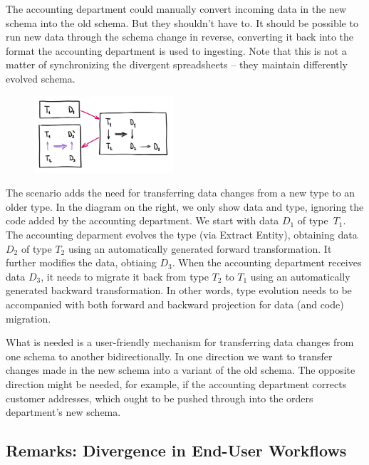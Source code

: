 \documentclass[english,submission]{programming}
\DeclareRobustCommand{\frameworkbox}[1]{\leftbar#1\endleftbar}
\newcommand{\frameworkboxtitle}[1]{\noindent{\firamedium #1.}\quad}
\begin{document}
The accounting department could manually convert incoming data in the new schema into the old schema. But they
shouldn't have to. It should be possible to run new data through the schema change in reverse,
converting it back into the format the accounting department is used to ingesting. Note that
this is not a matter of synchronizing the divergent spreadsheets -- they maintain differently
evolved schema.

\frameworkbox{
\begin{figure}
\vspace{-1.5em}
\includegraphics[width=14em]{figures/arr-backport.png}
\vspace{-2.5em}
\end{figure}
\frameworkboxtitle{Bidirectional Data Migration}
The scenario adds the need for transferring data changes from a new type to an older type.
In the diagram on the right, we only show data and type, ignoring the code added by the
accounting department. We start with data $D_1$ of type~$T_1$. The accounting deparment
evolves the type (via Extract Entity), obtaining data $D_2$ of type $T_2$ using an automatically
generated forward transformation. It further modifies the data, obtiaing $D_3$. When the
accounting department receives data $D_3$, it needs to migrate it back from type $T_2$ to
$T_1$ using an automatically generated backward transformation. In other words,
type evolution needs to be accompanied with both forward and backward projection for data
(and code) migration.}

What is needed is a user-friendly mechanism for transferring data changes from one schema to
another bidirectionally. In one direction we want to transfer changes made in the new schema
into a variant of the old schema. The opposite direction might be needed, for example,
if the accounting department corrects customer addresses, which ought to be pushed
through into the orders department's new schema.

\subsection*{Remarks: Divergence in End-User Workflows}
\end{document}
